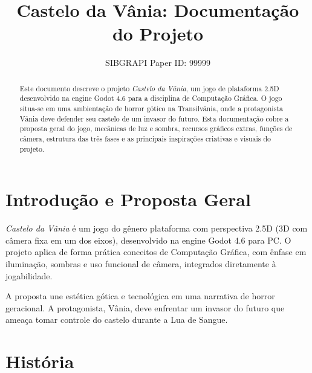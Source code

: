 \documentclass[10pt,conference]{IEEEtran}
\newif\iffinal
\newcommand{\cmtid}{99999}
\begin{document}
\title{Castelo da Vânia: Documentação do Projeto}

\iffinal

\author{
\IEEEauthorblockN{Alicia Silva Nascimento \\ Bruna de Andrade da Silva \\ Bruna Luísa Costa Reis dos Santos \\ Maria Eduarda Oliveira de A}
}

\else
  \author{SIBGRAPI Paper ID: \cmtid \\ }
  \linenumbers
\fi

\maketitle

\begin{abstract}
Este documento descreve o projeto \textit{Castelo da Vânia}, um jogo de plataforma 2.5D desenvolvido na engine Godot 4.6 para a disciplina de Computação Gráfica. O jogo situa-se em uma ambientação de horror gótico na Transilvânia, onde a protagonista Vânia deve defender seu castelo de um invasor do futuro. Esta documentação cobre a proposta geral do jogo, mecânicas de luz e sombra, recursos gráficos extras, funções de câmera, estrutura das três fases e as principais inspirações criativas e visuais do projeto.
\end{abstract}

\IEEEpeerreviewmaketitle


\section{Introdução e Proposta Geral}

\textit{Castelo da Vânia} é um jogo do gênero plataforma com perspectiva 2.5D (3D com câmera fixa em um dos eixos), desenvolvido na engine Godot 4.6 para PC. O projeto aplica de forma prática conceitos de Computação Gráfica, com ênfase em iluminação, sombras e uso funcional de câmera, integrados diretamente à jogabilidade.

A proposta une estética gótica e tecnológica em uma narrativa de horror geracional. A protagonista, Vânia, deve enfrentar um invasor do futuro que ameaça tomar controle do castelo durante a Lua de Sangue.

\section{História}
\end{document}

